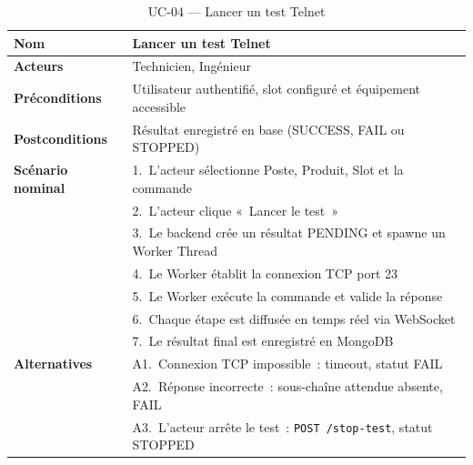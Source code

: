 \begin{table}[H]
  \centering
  \caption{UC-04 --- Lancer un test Telnet}
  \label{tab:uc04}
  \begin{tabular}{|L{3.5cm}|L{10cm}|}
    \hline
    \textbf{Nom} & Lancer un test Telnet \\
    \hline
    \textbf{Acteurs} & Technicien, Ingénieur \\
    \hline
    \textbf{Préconditions} & Utilisateur authentifié, slot configuré et équipement accessible \\
    \hline
    \textbf{Postconditions} & Résultat enregistré en base (SUCCESS, FAIL ou STOPPED) \\
    \hline
    \textbf{Scénario nominal} &
      1.~L'acteur sélectionne Poste, Produit, Slot et la commande \\
    & 2.~L'acteur clique «~Lancer le test~» \\
    & 3.~Le backend crée un résultat PENDING et spawne un Worker Thread \\
    & 4.~Le Worker établit la connexion TCP port 23 \\
    & 5.~Le Worker exécute la commande et valide la réponse \\
    & 6.~Chaque étape est diffusée en temps réel via WebSocket \\
    & 7.~Le résultat final est enregistré en MongoDB \\
    \hline
    \textbf{Alternatives} &
      A1.~Connexion TCP impossible~: timeout, statut FAIL \\
    & A2.~Réponse incorrecte~: sous-chaîne attendue absente, FAIL \\
    & A3.~L'acteur arrête le test~: \texttt{POST /stop-test}, statut STOPPED \\
    \hline
  \end{tabular}
\end{table}


